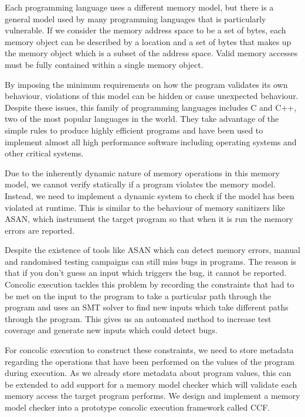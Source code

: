 \documentclass[12pt,twoside]{report}
\begin{document}
Each programming language uses a different memory model, but there is a general model used by many programming languages that is particularly vulnerable. If we consider the memory address space to be a set of bytes, each memory object can be described by a location and a set of bytes that makes up the memory object which is a subset of the address space. Valid memory accesses must be fully contained within a single memory object.

By imposing the minimum requirements on how the program validates its own behaviour, violations of this model can be hidden or cause unexpected behaviour. Despite these issues, this family of programming languages includes C and C++, two of the most popular languages in the world. They take advantage of the simple rules to produce highly efficient programs and have been used to implement almost all high performance software including operating systems and other critical systems.

Due to the inherently dynamic nature of memory operations in this memory model, we cannot verify statically if a program violates the memory model. Instead, we need to implement a dynamic system to check if the model has been violated at runtime. This is similar to the behaviour of memory sanitizers like ASAN, which instrument the target program so that when it is run the memory errors are reported. 

Despite the existence of tools like ASAN which can detect memory errors, manual and randomised testing campaigns can still miss bugs in programs. The reason is that if you don't guess an input which triggers the bug, it cannot be reported. Concolic execution tackles this problem by recording the constraints that had to be met on the input to the program to take a particular path through the program and uses an SMT solver to find new inputs which take different paths through the program. This gives us an automated method to increase test coverage and generate new inputs which could detect bugs.

For concolic execution to construct these constraints, we need to store metadata regarding the operations that have been performed on the values of the program during execution. As we already store metadata about program values, this can be extended to add support for a memory model checker which will validate each memory access the target program performs. We design and implement a memory model checker into a prototype concolic execution framework called CCF.

\begingroup
\let\clearpage\relax
\end{document}
